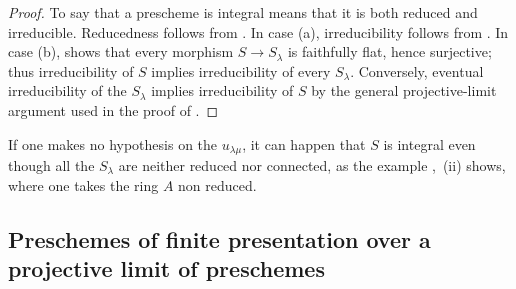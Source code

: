 \begin{proof}
To say that a prescheme is integral means that it is both reduced and irreducible. Reducedness follows from . In case (a), irreducibility follows from . In case (b),  shows that every morphism $S\to S_\lambda$ is faithfully flat, hence surjective; thus irreducibility of $S$ implies irreducibility of every $S_\lambda$. Conversely, eventual irreducibility of the $S_\lambda$ implies irreducibility of $S$ by the general projective-limit argument used in the proof of .
\end{proof}

\begin{remark}[8.7.4]
\label{IV.8.7.4}
If one makes no hypothesis on the $u_{\lambda\mu}$, it can happen that $S$ is integral even though all the $S_\lambda$ are neither reduced nor connected, as the example ,~(ii) shows, where one takes the ring $A$ non reduced.
\end{remark}

\subsection{Preschemes of finite presentation over a projective limit of preschemes}
\label{subsection:IV.8.8}

